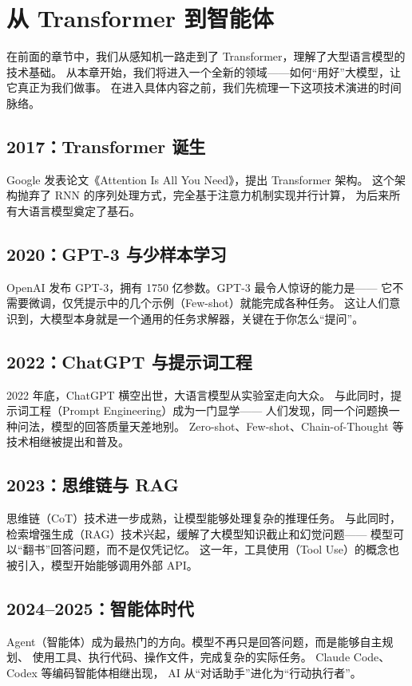\chapter*{从 Transformer 到智能体}

在前面的章节中，我们从感知机一路走到了 Transformer，理解了大型语言模型的技术基础。
从本章开始，我们将进入一个全新的领域——如何“用好”大模型，让它真正为我们做事。
在进入具体内容之前，我们先梳理一下这项技术演进的时间脉络。

\section*{2017：Transformer 诞生}
Google 发表论文《Attention Is All You Need》，提出 Transformer 架构。
这个架构抛弃了 RNN 的序列处理方式，完全基于注意力机制实现并行计算，
为后来所有大语言模型奠定了基石。

\section*{2020：GPT-3 与少样本学习}
OpenAI 发布 GPT-3，拥有 1750 亿参数。GPT-3 最令人惊讶的能力是——
它不需要微调，仅凭提示中的几个示例（Few-shot）就能完成各种任务。
这让人们意识到，大模型本身就是一个通用的任务求解器，关键在于你怎么“提问”。

\section*{2022：ChatGPT 与提示词工程}
2022 年底，ChatGPT 横空出世，大语言模型从实验室走向大众。
与此同时，提示词工程（Prompt Engineering）成为一门显学——
人们发现，同一个问题换一种问法，模型的回答质量天差地别。
Zero-shot、Few-shot、Chain-of-Thought 等技术相继被提出和普及。

\section*{2023：思维链与 RAG}
思维链（CoT）技术进一步成熟，让模型能够处理复杂的推理任务。
与此同时，检索增强生成（RAG）技术兴起，缓解了大模型知识截止和幻觉问题——
模型可以“翻书”回答问题，而不是仅凭记忆。
这一年，工具使用（Tool Use）的概念也被引入，模型开始能够调用外部 API。

\section*{2024--2025：智能体时代}
Agent（智能体）成为最热门的方向。模型不再只是回答问题，而是能够自主规划、
使用工具、执行代码、操作文件，完成复杂的实际任务。
Claude Code、Codex 等编码智能体相继出现，
AI 从“对话助手”进化为“行动执行者”。

